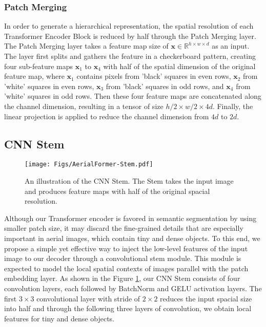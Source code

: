 \documentclass[journal]{IEEEtran}
\begin{document}
\subsubsection{Patch Merging} In order to generate a hierarchical representation, the spatial resolution of each Transformer Encoder Block is reduced by half through the Patch Merging layer.
The Patch Merging layer takes a feature map size of $\mathbf{x} \in \mathbb{R}^{h \times w \times d}$ as an input. 
The layer first splits and gathers the feature in a checkerboard pattern, creating four sub-feature maps $\mathbf{x}_1$ to $\mathbf{x}_4$ with half of the spatial dimension of the original feature map, where $\mathbf{x}_1$ contains pixels from 'black' squares in even rows, $\mathbf{x}_2$ from 'white' squares in even rows, $\mathbf{x}_3$ from 'black' squares in odd rows, and $\mathbf{x}_4$ from 'white' squares in odd rows. Then these four feature maps are concatenated along the channel dimension, resulting in a tensor of size $h/2 \times w/2 \times 4d$. Finally, the linear projection is applied to reduce the channel dimension from $4d$ to $2d$.





\subsection{CNN Stem}

\begin{figure}[!t]
    \centering
    \texttt{[image: Figs/AerialFormer-Stem.pdf]}
    \caption{An illustration of the CNN Stem. The Stem takes the input image and produces feature maps with half of the original spacial resolution.}
    \label{fig:stem}
\end{figure}

Although our Transformer encoder is favored in semantic segmentation by using smaller patch size, it may discard the fine-grained details that are especially important in aerial images, which contain tiny and dense objects. To this end, we propose a simple yet effective way to inject the low-level features of the input image to our decoder through a convolutional stem module. 
This module is expected to model the local spatial contexts of images parallel with the patch embedding layer. As shown in the Figure \ref{fig:stem}, our CNN Stem consists of four convolution layers, each followed by BatchNorm \cite{ioffe2015batch} and GELU \cite{hendrycks2016gaussian} activation layers. The first $3\times 3$ convolutional layer with stride of $2\times 2$ reduces the input spacial size into half and through the following three layers of convolution, we obtain local features for tiny and dense objects.
\end{document}
